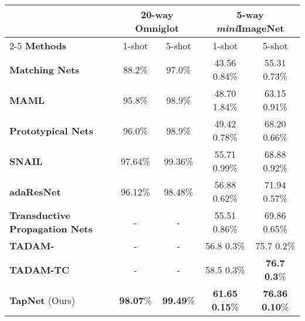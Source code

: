 \documentclass{article}
\begin{document}
\begin{table*}[h]
  \caption{Few-shot classification accuracies for 20-way Omniglot and 5-way \textit{mini}ImageNet}
  \label{acc_table1}
  \centering
  \begin{tabular}{l||cc||cc}
    \toprule  
    & \multicolumn{2}{c}{\textbf{20-way Omniglot}} & \multicolumn{2}{c}{\textbf{5-way \textit{mini}ImageNet}} \\
    \cmidrule{2-5}
    \textbf{Methods}    & 1-shot & 5-shot	& 1-shot & 5-shot  \\
    \midrule
    \textbf{Matching Nets} \cite{MN}  & 88.2\%	& 97.0\% & 43.56  0.84\%  & 55.31  0.73\%   \\
    \textbf{MAML} \cite{MAML} & 95.8\%	& 98.9\% & 48.70  1.84\%  & 63.15  0.91\%	 \\
    \textbf{Prototypical Nets} \cite{PN} & 96.0\%	& 98.9\% & 49.42  0.78\%  & 68.20  0.66\%	  \\
    \textbf{SNAIL} \cite{SNAIL}  & 97.64\% & 99.36\% & 55.71  0.99\%  & 68.88  0.92\%  \\
    \textbf{adaResNet} \cite{adares} & 96.12\% & 98.48\% & 56.88  0.62\% & 71.94  0.57\% \\
    \textbf{Transductive Propagation Nets} \cite{Liu} & - & - & 55.51  0.86\% & 69.86  0.65\% \\
    \textbf{TADAM-} \cite{TADAM} & - & - &56.8  0.3\% & 75.7  0.2\% \\ 
    \textbf{TADAM-TC} \cite{TADAM}  & - & - &58.5  0.3\% & \textbf{76.7}  \textbf{0.3}\% \\
    \textbf{TapNet} (Ours)  & \textbf{98.07}\% & \textbf{99.49}\%  &\textbf{61.65}  \textbf{0.15}\%  & \textbf{76.36}  \textbf{0.10}\%\\
    \bottomrule
  \end{tabular}
\end{table*}
\end{document}
